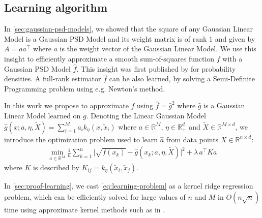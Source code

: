 \subsection{Learning algorithm}\label{sec:optimization}

In \cref{sec:gaussian-psd-models}, we showed that the square of any Gaussian Linear Model is a Gaussian PSD Model and its weight matrix is of rank $1$ and given by $A =aa^\top $ where $a$ is the weight vector of the Gaussian Linear Model. We use this insight to efficiently approximate a smooth sum-of-squares function $f$ with a Gaussian PSD Model $\hat f$. This insight was first published by \cite{sampling-ulysse} for probability densities. A full-rank estimator $\hat f$ can be also learned, by solving a Semi-Definite Programming problem using e.g. Newton's method.


In this work we propose to approximate $f$ using $\hat f= \hat g^2$ where $\hat g$ is a Gaussian Linear Model learned on $g$. Denoting the Linear Gaussian Model $\hat g(x ; a, \eta, \tilde X) = \sum_{i=1}^M a_ik_\eta(x, \tilde x_i)$ where $a\in\mathbb R^M$, $\eta \in \mathbb R_+^d$ and $\tilde X \in \mathbb R^{M\times d}$, we introduce the optimization problem used to learn $\hat a$ from data points $X\in\mathbb R^{n\times d}$:
\begin{align}\label{eq:learning-problem}
\min_{a \in\mathbb R^M} \frac{1}{n}\sum_{k=1}^n \vert \sqrt{f(x_k)} - \hat g(x_k ; a, \eta, \tilde X)\vert^2+ \lambda \, a^\top Ka
\end{align}
where $K$ is described by $K_{ij}=k_\eta(\tilde x_i, \tilde x_j)$.

In \cref{sec:proof-learning}, we cast \cref{eq:learning-problem} as a kernel ridge regression problem, which can be efficiently solved for large values of $n$ and $M$ in $O(n\sqrt{n})$ time using approximate kernel methods such as in \cite{falkon}.

